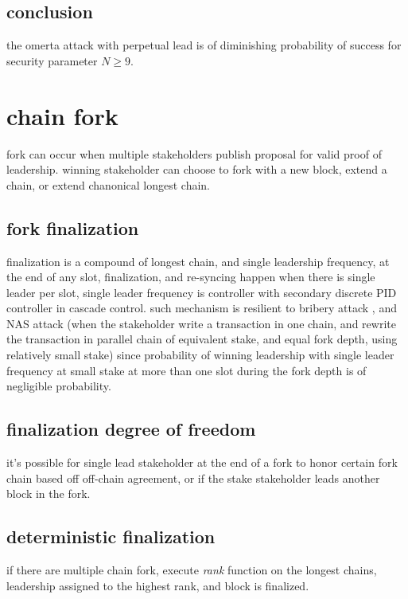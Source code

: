 \documentclass{article}
\begin{document}
\subsection {conclusion}
the omerta attack with perpetual lead is of diminishing probability of success for security parameter $N \ge 9$.

\section{chain fork}
fork can occur when multiple stakeholders publish proposal for valid proof of leadership.
winning stakeholder can choose to fork with a new block, extend a chain, or extend chanonical longest chain.

\subsection{fork finalization}
finalization is a compound of longest chain, and single leadership frequency, at the end of any slot, finalization, and re-syncing happen when there is single leader per slot, single leader frequency is controller with secondary discrete PID controller in cascade control.
such mechanism is resilient to bribery attack \cite{attack_bribery}, and NAS attack (when the stakeholder write a transaction in one chain, and rewrite the transaction in parallel chain of equivalent stake, and equal fork depth, using relatively small stake) since probability of winning leadership with single leader frequency at small stake at more than one slot during the fork depth  is of negligible probability.

\subsection {finalization degree of freedom}
it's possible for single lead stakeholder at the end of a fork to honor certain fork chain based off off-chain agreement, or if the stake stakeholder leads another block in the fork.

\label{finalization}
\subsection {deterministic finalization}
if there are multiple chain fork, execute \emph{rank} function on the longest chains, leadership assigned to the highest rank, and block is finalized.
\end{document}
